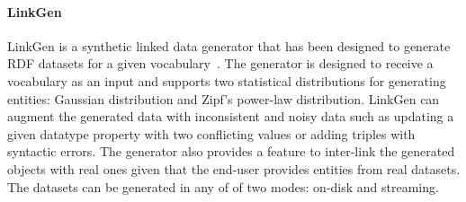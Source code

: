 \paragraph{LinkGen} LinkGen is a synthetic linked data generator that has been designed to generate RDF datasets for a given vocabulary~\cite{10.1007/978-3-319-46547-0_12}. The generator is designed to receive a vocabulary as an input  and supports two statistical distributions for generating entities: Gaussian distribution and Zipf's power-law distribution. LinkGen can augment the generated data with inconsistent and noisy  data such as updating a given datatype property with two conflicting values or  adding triples with syntactic errors. \iffalse, adding wrong statements by assigning them with invalid domain and creating instances with no type information.\fi The generator also provides a feature to inter-link the generated objects with real ones given that the end-user provides entities from real datasets. The datasets can be generated in any of of two modes: on-disk and streaming.


